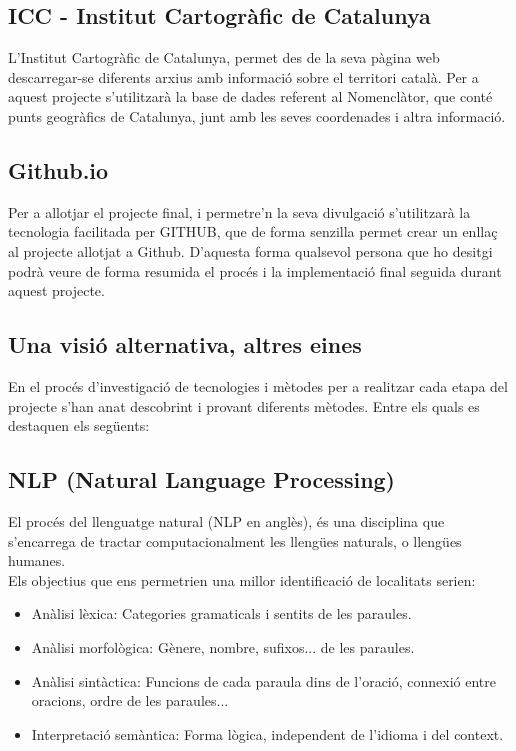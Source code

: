 \documentclass[12pt,a4paper,openright,oneside]{article}
\numberwithin{equation}{section}
\theoremstyle{definition}
\begin{document}
\subsection*{ICC - Institut Cartogràfic de Catalunya}
L'Institut Cartogràfic de Catalunya, permet des de la seva pàgina web descarregar-se diferents arxius amb informació sobre el territori català. Per a aquest projecte s'utilitzarà la base de dades referent al Nomenclàtor, que conté punts geogràfics de Catalunya, junt amb les seves coordenades i altra informació.\cite{icc}
\subsection*{Github.io}
Per a allotjar el projecte final, i permetre'n la seva divulgació s'utilitzarà la tecnologia facilitada per GITHUB, que de forma senzilla permet crear un enllaç al projecte allotjat a Github. D'aquesta forma qualsevol persona que ho desitgi podrà veure de forma resumida el procés i la implementació final seguida durant aquest projecte.\cite{github.io}
\subsection{Una visió alternativa, altres eines}
En el procés d'investigació de tecnologies i mètodes per a realitzar cada etapa del projecte s'han anat descobrint i provant diferents mètodes. Entre els quals es destaquen els següents:
\subsection*{NLP (Natural Language Processing)}
El procés del llenguatge natural (NLP en anglès), és una disciplina que s'encarrega de tractar computacionalment les llengües naturals, o llengües humanes.\\
Els objectius que ens permetrien una millor identificació de localitats serien:
\begin{itemize}
\item Anàlisi lèxica: Categories gramaticals i sentits de les paraules.
\item Anàlisi morfològica: Gènere, nombre, sufixos... de les paraules.
\item Anàlisi sintàctica: Funcions de cada paraula dins de l'oració, connexió entre oracions, ordre de les paraules...
\item Interpretació semàntica: Forma lògica, independent de l'idioma i del context.
\end{itemize}
\end{document}
